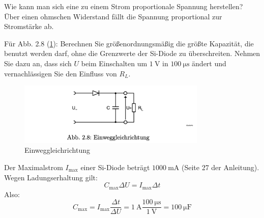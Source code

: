 \documentclass{article}
\theoremstyle{definition}
\begin{document}
\label{G}
\begin{voraufgabe}{Wie kann man sich eine zu einem Strom proportionale Spannung herstellen?}
    Über einen ohmschen Widerstand fällt die Spannung proportional zur Stromstärke ab.
    

\end{voraufgabe}

\begin{voraufgabe}{Für Abb. 2.8 (\ref{fig:Abb2.8}): Berechnen Sie größenordnungsmäßig die größte Kapazität, die benutzt werden darf, ohne die Grenzwerte der Si-Diode zu überschreiten. Nehmen Sie dazu an, dass sich $U$ beim Einschalten um $\SI{1}{\volt}$ in $\SI{100}{\micro\second}$ ändert und vernachlässigen Sie den Einfluss von $R_L$.}
    \begin{figure}[H]
        \centering
        \includegraphics[width=0.8\textwidth]{figs/fig2_8.png}
        \caption{Einweggleichrichtung\cite{anleitung}}
        \label{fig:Abb2.8}
    \end{figure}
Der Maximalstrom $I_\mathrm{max}$ einer Si-Diode beträgt $\SI{1000}{\milli\ampere}$ (Seite 27 der Anleitung\cite{anleitung}). Wegen Ladungserhaltung gilt:
\begin{equation*}
    C_\mathrm{max} \Delta U = I_\mathrm{max} \Delta t
\end{equation*}
Also:
\begin{equation*}
    C_\mathrm{max} = I_\mathrm{max} \frac{\Delta t}{\Delta U} = \SI{1}{\ampere} \frac{\SI{100}{\micro\second}}{\SI{1}{\volt}} = \SI{100}{\micro\farad}
\end{equation*}
\end{voraufgabe}
\end{document}

